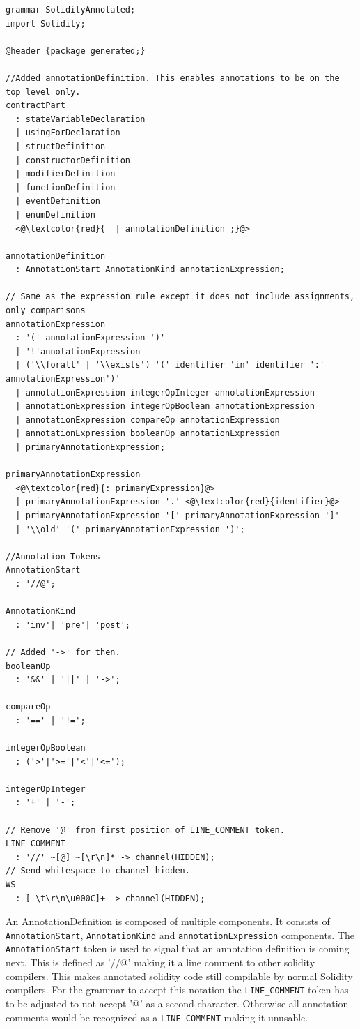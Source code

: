 \documentclass[a4paper]{article}
\begin{document}
\begin{lstlisting}[basicstyle=\ttfamily, breaklines=true]
grammar SolidityAnnotated;
import Solidity;

@header {package generated;}

//Added annotationDefinition. This enables annotations to be on the top level only.
contractPart
  : stateVariableDeclaration
  | usingForDeclaration
  | structDefinition
  | constructorDefinition
  | modifierDefinition
  | functionDefinition
  | eventDefinition
  | enumDefinition 
  <@\textcolor{red}{  | annotationDefinition ;}@>

annotationDefinition
  : AnnotationStart AnnotationKind annotationExpression;

// Same as the expression rule except it does not include assignments, only comparisons
annotationExpression
  : '(' annotationExpression ')'
  | '!'annotationExpression
  | ('\\forall' | '\\exists') '(' identifier 'in' identifier ':' annotationExpression')'
  | annotationExpression integerOpInteger annotationExpression
  | annotationExpression integerOpBoolean annotationExpression
  | annotationExpression compareOp annotationExpression
  | annotationExpression booleanOp annotationExpression
  | primaryAnnotationExpression;

primaryAnnotationExpression
  <@\textcolor{red}{: primaryExpression}@> 
  | primaryAnnotationExpression '.' <@\textcolor{red}{identifier}@> 
  | primaryAnnotationExpression '[' primaryAnnotationExpression ']'
  | '\\old' '(' primaryAnnotationExpression ')';

//Annotation Tokens
AnnotationStart
  : '//@';

AnnotationKind
  : 'inv'| 'pre'| 'post';

// Added '->' for then.
booleanOp
  : '&&' | '||' | '->';

compareOp
  : '==' | '!=';

integerOpBoolean
  : ('>'|'>='|'<'|'<=');

integerOpInteger
  : '+' | '-';

// Remove '@' from first position of LINE_COMMENT token. 
LINE_COMMENT 
  : '//' ~[@] ~[\r\n]* -> channel(HIDDEN);
// Send whitespace to channel hidden.
WS
  : [ \t\r\n\u000C]+ -> channel(HIDDEN);
\end{lstlisting}
An AnnotationDefinition is composed of multiple components. It consists of \texttt{AnnotationStart}, \texttt{AnnotationKind} and \texttt{annotationExpression} components. The \texttt{AnnotationStart} token is used to signal that an annotation definition is coming next. This is defined as '//@' making it a line comment to other solidity compilers. This makes annotated solidity code still compilable by normal Solidity compilers. For the grammar to accept this notation the \texttt{LINE\_COMMENT} token has to be adjusted to not accept '@' as a second character. Otherwise all annotation comments would be recognized as a \texttt{LINE\_COMMENT} making it unusable. \par
\end{document}
